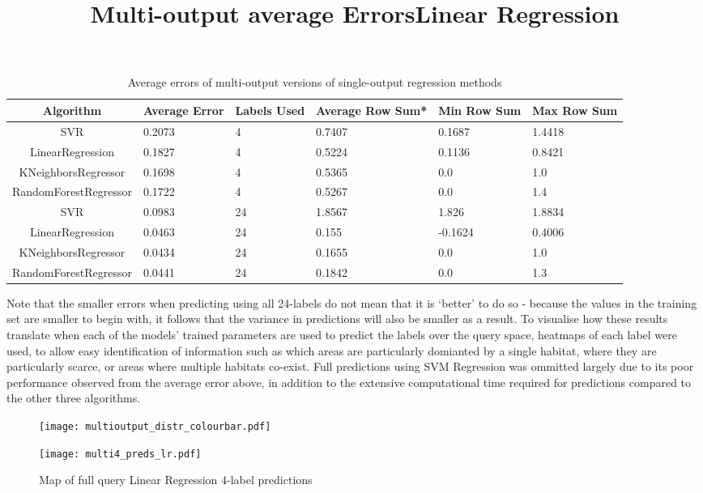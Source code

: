 \begin{table}[H]
    \centering
    \title{\large{\textbf{Multi-output average Errors}}}
    \begin{tabular}{|c|C{2cm}|C{2cm}|C{2cm}|C{2cm}|C{2cm}|}
        \hline
        Algorithm & Average Error & Labels Used & Average Row Sum* & Min Row Sum & Max Row Sum\\\hline
        SVR & 0.2073 & 4 & 0.7407 & 0.1687 & 1.4418\\
        LinearRegression & 0.1827 & 4 & 0.5224 & 0.1136 & 0.8421\\
        KNeighborsRegressor & 0.1698 & 4 & 0.5365 & 0.0 & 1.0\\
        RandomForestRegressor & 0.1722 & 4 & 0.5267 & 0.0 & 1.4\\
        SVR & 0.0983 & 24 & 1.8567 & 1.826 & 1.8834\\
        LinearRegression & 0.0463 & 24 & 0.155 & -0.1624 & 0.4006\\
        KNeighborsRegressor & 0.0434 & 24 & 0.1655 & 0.0 & 1.0\\
        RandomForestRegressor & 0.0441 & 24 & 0.1842 & 0.0 & 1.3\\
        \hline
    \end{tabular}
    \label{table:dmbasicresults}
    \caption{Average errors of multi-output versions of single-output regression methods}
\end{table}

Note that the smaller errors when predicting using all 24-labels do not mean that it is `better' to do so - because the values in the training set are smaller to begin with, it follows that the variance in predictions will also be smaller as a result. To visualise how these results translate when each of the models' trained parameters are used to predict the labels over the query space, heatmaps of each label were used, to allow easy identification of information such as which areas are particularly domianted by a single habitat, where they are particularly scarce, or areas where multiple habitats co-exist. Full predictions using SVM Regression was ommitted largely due to its poor performance observed from the average error above, in addition to the extensive computational time required for predictions compared to the other three algorithms.

\begin{figure}[H]
    \title{\large{\textbf{Linear Regression}}}
    \centerline{\texttt{[image: multioutput\_distr\_colourbar.pdf]}}
    \centerline{\texttt{[image: multi4\_preds\_lr.pdf]}}
    \caption{Map of full query Linear Regression 4-label predictions}
    \label{fig:multi4_lr}
\end{figure}

